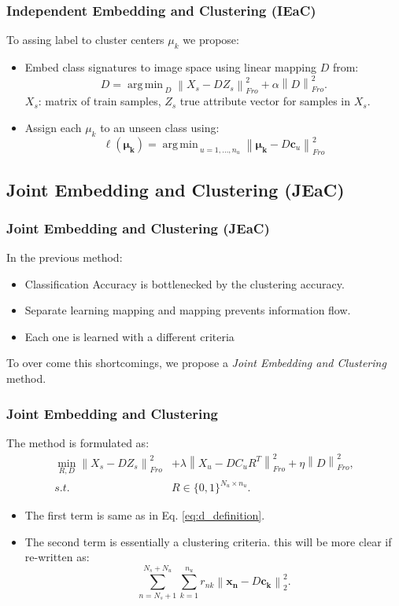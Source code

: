 \documentclass{beamer}
\DeclareMathOperator*{\argmin}{arg\,min\,}
\newcommand{\normtwo}[1]{\left \lVert #1 \right \rVert_2^2}
\newcommand{\normf}[1]{\left \lVert #1 \right \rVert_{Fro}}
\begin{document}
\begin{frame}\frametitle{Independent Embedding and Clustering (IEaC)}
To assing label to cluster centers $\mu_k$ we propose:
\begin{itemize}
  \item Embed class signatures to image space using linear mapping $D$ from:
  \begin{equation} \label{eq:d_definition}
  D = \argmin_D \normf{X_s - D Z_s}^2 + \alpha \normf{D}^2.
\end{equation}
$X_s$: matrix of train samples, $Z_s$ true attribute vector for samples in $X_s.$
\item Assign each $\mu_k$ to an unseen class using:
\begin{equation}
\label{eq:simple_assignment}
\ell(\boldsymbol{\mu_k}) = \argmin_{u=1,\ldots,n_u} \normf{\boldsymbol{\mu_k} - D\mathbf{c}_{u}}^2
\end{equation}\end{itemize}
\end{frame}




\subsection{Joint Embedding and Clustering (JEaC)}
\label{sec:Joint Embedding and Clustering (JEaC)}

\begin{frame}\frametitle{Joint Embedding and Clustering (JEaC)}
In the previous method:
\begin{itemize}
  \item Classification Accuracy is bottlenecked by the clustering accuracy.
  \item Separate learning mapping and mapping prevents information flow.
  \item Each one is learned with a different criteria
\end{itemize}
To over come this shortcomings, we propose a \textit{Joint Embedding and Clustering} method.
\end{frame}
\begin{frame}\frametitle{Joint Embedding and Clustering}
The method is formulated as:
\begin{align}
\label{eq:joint}
 \min_{R,D} \normf{X_s - D Z_s}^2  &+ \lambda \normf{X_u - D C_u R^T }^2 + \eta \normf{D}^2, \\
   s.t. \quad & R \in \{0,1\}^{N_u \times n_u}. \nonumber
\end{align}
\begin{itemize}
  \item
  The first term is same as in Eq. \eqref{eq:d_definition}.
  \item
  The second term is essentially a clustering criteria. this will be more clear if re-written as:
  \[
  \label{eq:essentialy_clustering}
\sum_{n=N_s+1}^{N_s + N_u} \sum_{k=1}^{n_u} r_{nk} \normtwo{\mathbf{x_n} - D \mathbf{c_k}}.
  \]
\end{itemize}
\end{frame}
\end{document}

